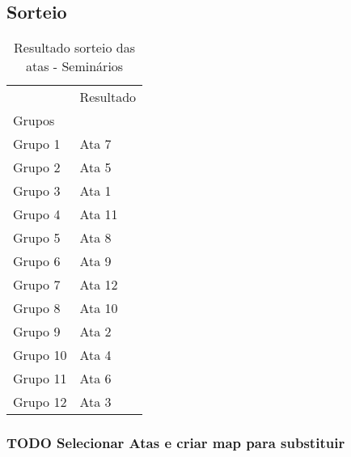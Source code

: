 \documentclass[11pt]{article}
\begin{document}
\subsection{Sorteio}
\label{sec:org773f78b}
\begin{table}
\centering
\caption{Resultado sorteio das atas - Seminários}
\begin{tabular}{ll}
\toprule
{} & Resultado \\
Grupos   &           \\
\midrule
Grupo 1  &     Ata 7 \\
Grupo 2  &     Ata 5 \\
Grupo 3  &     Ata 1 \\
Grupo 4  &    Ata 11 \\
Grupo 5  &     Ata 8 \\
Grupo 6  &     Ata 9 \\
Grupo 7  &    Ata 12 \\
Grupo 8  &    Ata 10 \\
Grupo 9  &     Ata 2 \\
Grupo 10 &     Ata 4 \\
Grupo 11 &     Ata 6 \\
Grupo 12 &     Ata 3 \\
\bottomrule
\end{tabular}
\end{table}


\subsubsection{{\bfseries\sffamily TODO} Selecionar Atas e criar map para substituir}
\label{sec:org6f8c4e8}
\end{document}
